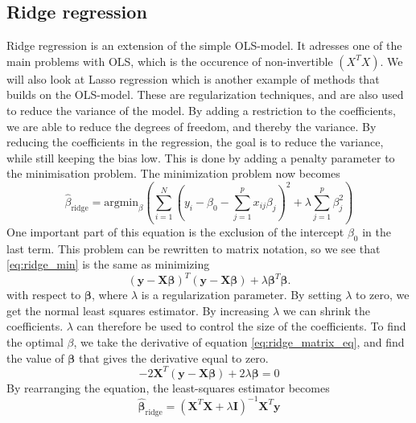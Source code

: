 \subsection{Ridge regression}
Ridge regression is an extension of the simple OLS-model. It adresses one of the main problems with OLS, which is the occurence of non-invertible $(X^TX)$. We will also look at Lasso regression which is another example of methods that builds on the OLS-model. These are regularization techniques, and are also used to reduce the variance of the model. By adding a restriction to the coefficients, we are able to reduce the degrees of freedom, and thereby the variance. By reducing the coefficients in the regression, the goal is to reduce the variance, while still keeping the bias low.\cite{hastie} This is done by adding a penalty parameter to the minimisation problem. 
The minimization problem now becomes
\begin{equation}
    \hat{\beta}_{\text{ridge}} = \text{argmin}_\beta\left(\sum_{i=1}^N(y_i - \beta_0 - \sum_{j=1}^p x_{ij}\beta_j)^2 + \lambda\sum_{j=1}^p\beta_j^2 \right)
    \label{eq:ridge_min}
\end{equation}\cite{hastie}
One important part of this equation is the exclusion of the intercept $\beta_0$ in the last term. This problem can be rewritten to matrix notation, so we see that \ref{eq:ridge_min} is the same as minimizing
\begin{equation}
(\boldsymbol{y - X\beta})^T(\boldsymbol{y - X\beta}) + \lambda \boldsymbol{\beta}^T\boldsymbol{\beta}.
\label{eq:ridge_matrix_eq}
\end{equation}
with respect to $\boldsymbol{\beta}$,
where $\lambda$ is a regularization parameter. By setting $\lambda$ to zero, we get the normal least squares estimator. By increasing $\lambda$ we can shrink the coefficients. $\lambda$ can therefore be used to control the size of the coefficients. 
To find the optimal $\beta$, we take the derivative of equation \ref{eq:ridge_matrix_eq}, and find the value of $\boldsymbol{\beta}$ that gives the derivative equal to zero. 
\begin{equation}
    -2\boldsymbol{X}^T(\boldsymbol{y - X\beta}) + 2\lambda \boldsymbol{\beta} = 0
\end{equation}
By rearranging the equation, the least-squares estimator becomes 
\begin{equation}
    \boldsymbol{\hat{\beta}}_{\text{ridge}} = (\boldsymbol{X}^T\boldsymbol{X} + \lambda \textbf{I})^{-1}\boldsymbol{X}^T\boldsymbol{y}
\end{equation}
